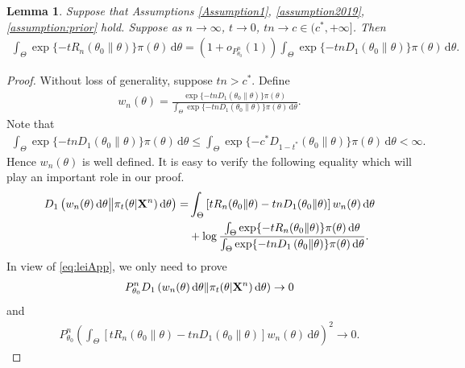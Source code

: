 \documentclass[11pt]{article}
\theoremstyle{plain}
\newtheorem{lemma}{\quad\quad Lemma}
\theoremstyle{definition}
\theoremstyle{remark}
\begin{document}
\begin{appendices}
\begin{lemma}
    Suppose that Assumptions \ref{Assumption1}, \ref{assumption2019}, \ref{assumption:prior} hold.
Suppose as $n \to \infty$, $t \to 0$, $tn \to c \in (c^*,+\infty]$.
Then
\begin{align*}
     \int_{\Theta} \exp \{-t R_n (\theta_0\| \theta)\} \pi (\theta) \, \mathrm d \theta  
     =
     (1+o_{P_{\theta_0}^n}(1))
    \int_\Theta \exp \{- tn D_1 \left( \theta_0 \| \theta \right)\} \pi(\theta) \, \mathrm d \theta.
\end{align*}
    \label{prop:ttowawa}
\end{lemma}
\begin{proof}
    Without loss of generality, suppose $tn > c^*$.
       Define
       \begin{align*}
           w_n(\theta) =
           \frac{
               \exp \{ -t n D_1\left( \theta_0 \| \theta \right) \} \pi(\theta)
           }{
               \int_{\Theta} 
               \exp \{ -t n D_1\left( \theta_0 \| \theta \right) \} \pi(\theta) \, \mathrm d \theta
           }.
       \end{align*}
       Note that
       \begin{align*}
               \int_{\Theta} 
               \exp \{ -t n D_1\left( \theta_0 \| \theta \right) \} \pi(\theta) \, \mathrm d \theta
               \leq
               \int_{\Theta} 
               \exp \{ -c^* D_{1-t^*}\left( \theta_0 \| \theta \right) \} \pi(\theta) \, \mathrm d \theta
               < \infty
               .
       \end{align*}
       Hence $w_n(\theta)$ is well defined.
       It is easy to verify the following equality which will play an important role in our proof.
\begin{equation}\label{eq:leiApp}
    \begin{aligned}
     D_1\left( 
        w_n (\theta) \, \mathrm d \theta
        \big\|
        \pi_t (\theta | \mathbf{X}^{n}) \, \mathrm d \theta
    \right)
    = &
    \int_{\Theta}
    \left[   t R_n(\theta_0\| \theta) - tn D_1 (\theta_0 \| \theta )  \right]
    w_n (\theta) \, \mathrm d \theta
    \\
    &
    + \log \frac{
        \int_{\Theta} \exp \{-t R_n (\theta_0\| \theta)\} \pi (\theta) \, \mathrm d \theta  
    }
    {
        \int_\Theta \exp \{-tn D_1 \left( \theta_0 \| \theta \right)\} \pi(\theta) \, \mathrm d \theta
    }
    .
    \end{aligned}
\end{equation}
    In view of \eqref{eq:leiApp}, we only need to prove
\begin{align}
    P_{\theta_0}^n D_1 \left( w_n (\theta)\, \mathrm d \theta \| \pi_t (\theta| \mathbf{X}^n) \, \mathrm d \theta \right) \to 0
    \label{toProof:1}
\end{align}
and
\begin{align}
    P_{\theta_0}^n \left( 
    \int_{\Theta}
    \left[   t R_n(\theta_0\| \theta) - tn D_1 (\theta_0 \| \theta )  \right]
    w_n (\theta) \, \mathrm d \theta
    \right)^2
    \to 0
    .
    \label{toProof:2}
\end{align}


\end{proof}
\end{appendices}
\end{document}
